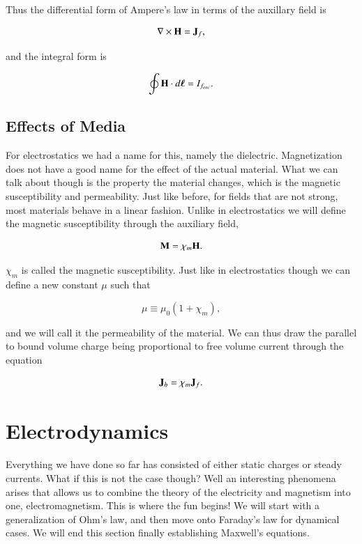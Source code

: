 \documentclass[preprint, review,12pt]{elsarticle}
\def\x{\times}
\def\.{\cdot}
\def\b{\textbf}
\def\bell{\bm{\ell}}
\def\={\equiv}
\def\curl{\nabla \x}
\begin{document}
Thus the differential form of Ampere's law in terms of the auxillary field is

\begin{equation}
    \curl \b H = \b J_f,
\end{equation}

and the integral form is

\begin{equation}
    \oint \b H \. d \bell = I_{f_{enc}}.
\end{equation}

\subsection{Effects of Media}

For electrostatics we had a name for this, namely the dielectric. Magnetization does not have a good name for the effect of the actual material. What we can talk about though is the property the material changes, which is the magnetic susceptibility and permeability. Just like before, for fields that are not strong, most materials behave in a linear fashion. Unlike in electrostatics we will define the magnetic susceptibility through the auxiliary field,

\begin{equation}
    \b M = \chi_m \b H.
\end{equation}

$\chi_m$ is called the magnetic susceptibility. Just like in electrostatics though we can define a new constant $\mu$ such that

\begin{equation}
    \mu \= \mu_0(1+\chi_m),
\end{equation}

and we will call it the permeability of the material. We can thus draw the parallel to bound volume charge being proportional to free volume current through the equation

\begin{equation}
    \b J_b = \chi_m \b J_f.
\end{equation}

\section{Electrodynamics}

Everything we have done so far has consisted of either static charges or steady currents. What if this is not the case though? Well an interesting phenomena arises that allows us to combine the theory of the electricity and magnetism into one, electromagnetism. This is where the fun begins! We will start with a generalization of Ohm's law, and then move onto Faraday's law for dynamical cases. We will end this section finally establishing Maxwell's equations.
\end{document}
